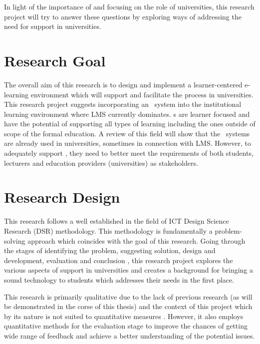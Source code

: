 In light of the importance of \LLLs and focusing on the role of universities,
this research project will try to answer these questions by exploring ways
of addressing the need for \LLLs support in universities.

\section{Research Goal}

The overall aim of this research is to design and implement a learner-centered
e-learning environment which will support and facilitate the \LLLs process in
universities. This research project suggests incorporating an \ep~system into
the institutional learning environment where LMS currently dominates. \ep s
are learner focused and have the potential of supporting all types of learning
including the ones outside of scope of the formal education. A review of this
field will show that the \ep~systems are already used in universities, sometimes
in connection with LMS. However, to adequately support \LLLsn, they need to
better meet the requirements of both students, lecturers and education providers
(universities) as \LLLs stakeholders.

\section{Research Design}

This research follows a well established in the field of ICT Design Science
Research (DSR) methodology. This methodology is fundamentally a problem-solving
approach \citep{Cross1993} which coincides with the goal of this research.
Going through the stages of identifying the problem, suggesting solution,
design and development, evaluation and conclusion
\citep{Peffers2008,Vaishnavi2007}, this research project explores the various
aspects of \LLLs support in universities and creates a background for bringing a
sound technology to students which addresses their needs in the first place.

This research is primarily qualitative due to the lack of previous research (as
will be demonstrated in the corse of this thesis) and the \LLLs context of this
project which by its nature is not suited to quantitative measures
\citep{Creswell2009}. However, it also employs quantitative methods for the 
evaluation stage to improve the chances of getting wide range of feedback and
achieve a better understanding of the potential issues.

